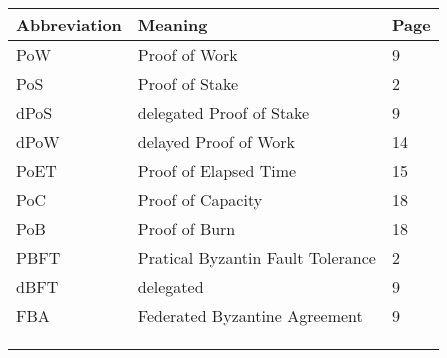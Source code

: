 \documentclass[doublespacing]{bmcart}
\begin{document}
\begin{CJK*}{UTF8}{gbsn}
\begin{tabular}{lll}
\hline
Abbreviation & Meaning  & Page  \\ \hline
PoW & Proof of Work & 9 \\ 
PoS & Proof of Stake & 2 \\ 
dPoS & delegated Proof of Stake & 9 \\ 
dPoW & delayed Proof of Work & 14 \\ 
PoET & Proof of Elapsed Time  & 15 \\ 
PoC & Proof of Capacity & 18 \\ 
PoB & Proof of Burn & 18 \\ 
PBFT & Pratical Byzantin Fault Tolerance & 2 \\ 
dBFT & delegated  & 9 \\ 
FBA & Federated Byzantine Agreement & 9 \\ 
 &  &  \\ 
 &  &  \\ 
 &  &  \\ 
\end{tabular}


\end{CJK*}
\end{document}
